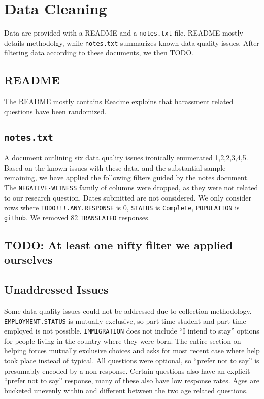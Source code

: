 \documentclass[]{IEEEtran}
\begin{document}
\section{Data Cleaning}

Data are provided with a \textsc{README} and a \texttt{notes.txt} file.
\textsc{README} mostly details methodolgy, while \texttt{notes.txt} summarizes known data quality issues.
After filtering data according to these documents, we then TODO.

\subsection{\textsc{README}}

The \textsc{README} mostly contains Readme exploins that harassment related questions have been randomized.

\subsection{\texttt{notes.txt}}

A document outlining six data quality issues ironically enumerated 1,2,2,3,4,5.
Based on the known issues with these data, and the substantial sample remaining, we have applied the following filters guided by the notes document.
The \texttt{NEGATIVE-WITNESS} family of columns were dropped, as they were not related to our research question.
Dates submitted are not considered.
We only consider rows where \texttt{TODO!!!.ANY.RESPONSE} is 0, \texttt{STATUS} is \texttt{Complete}, \texttt{POPULATION} is \texttt{github}.
We removed 82 \texttt{TRANSLATED} responses.

\subsection{TODO: At least one nifty filter we applied ourselves}

\subsection{Unaddressed Issues}

Some data quality issues could not be addressed due to collection methodology.
\texttt{EMPLOYMENT.STATUS} is mutually exclusive, so part-time student and part-time employed is not possible.
\texttt{IMMIGRATION} does not include ``I intend to stay'' options for people living in the country where they were born.
The entire section on helping forces mutually exclusive choices and asks for most recent case where help took place instead of typical.
All questions were optional, so ``prefer not to say'' is presumably encoded by a non-response. Certain questions also have an explicit ``prefer not to say'' response, many of these also have low response rates.
Ages are bucketed unevenly within and different between the two age related questions.
\end{document}
